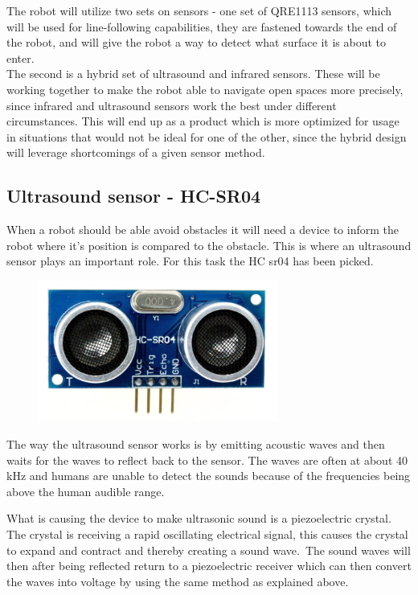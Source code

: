 The robot will utilize two sets on sensors - one set of QRE1113 sensors, which will be used for line-following capabilities, they are fastened towards the end of the robot, and will give the robot a way to detect what surface it is about to enter.\\
The second is a hybrid set of ultrasound and infrared sensors. These will be working together to make the robot able to navigate open spaces more precisely, since infrared and ultrasound sensors work the best under different circumstances. This will end up as a product which is more optimized for usage in situations that would not be ideal for one of the other, since the hybrid design will leverage shortcomings of a given sensor method.\\

\subsection{Ultrasound sensor - HC-SR04}
When a robot should be able avoid obstacles it will need a device to inform the robot where it's position is compared to the obstacle. This is where an ultrasound sensor plays an important role. For this task the HC sr04 has been picked.\\

\begin{figure}[!ht]
	\centering
	\includegraphics[width=0.7\textwidth]{figures/hc04.jpg}
	\caption{}
	\label{Hardware diagram}
\end{figure}


The way the ultrasound sensor works is by emitting acoustic waves and then waits for the waves to reflect back to the sensor. The waves are often at about 40 kHz and humans are unable to detect the sounds because of the frequencies being above the human audible range.\

What is causing the device to make ultrasonic sound is a piezoelectric crystal. The crystal is receiving a rapid oscillating electrical signal, this causes the crystal to expand and contract and thereby creating a sound wave.\ The sound waves will then after being reflected return to a piezoelectric receiver which can then convert the waves into voltage by using the same method as explained above. \\


